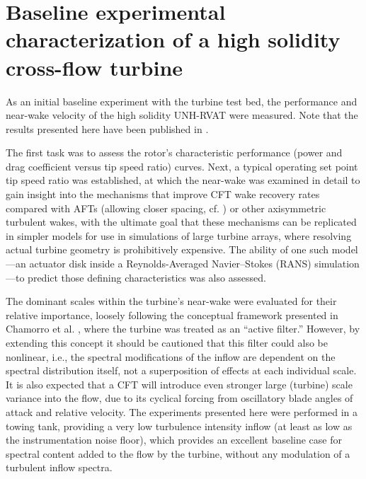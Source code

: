 \chapter{Baseline experimental characterization of a high solidity cross-flow
turbine}\label{chap:RVAT-baseline}

As an initial baseline experiment with the turbine test bed, the performance and
near-wake velocity of the high solidity UNH-RVAT were measured. Note that the
results presented here have been published in \cite{Bachant2013,
    Bachant2015-JoT}.

The first task was to assess the rotor's characteristic performance (power and
drag coefficient versus tip speed ratio) curves. Next, a typical operating set
point tip speed ratio was established, at which the near-wake was examined in
detail to gain insight into the mechanisms that improve CFT wake recovery rates
compared with AFTs (allowing closer spacing, {cf.} \cite{Kinzel2012}) or other
axisymmetric turbulent wakes, with the ultimate goal that these mechanisms can
be replicated in simpler models for use in simulations of large turbine arrays,
where resolving actual turbine geometry is prohibitively expensive. The ability
of one such model---an actuator disk inside a Reynolds-Averaged Navier--Stokes
(RANS) simulation---to predict those defining characteristics was also assessed.

The dominant scales within the turbine's near-wake were evaluated for their
relative importance, loosely following the conceptual framework presented in
Chamorro et al. \cite{Chamorro2012b}, where the turbine was treated as an
``active filter.'' However, by extending this concept it should be cautioned
that this filter could also be nonlinear, i.e., the spectral modifications of
the inflow are dependent on the spectral distribution itself, not a
superposition of effects at each individual scale. It is also expected that a
CFT will introduce even stronger large (turbine) scale variance into the flow,
due to its cyclical forcing from oscillatory blade angles of attack and relative
velocity. The experiments presented here were performed in a towing tank,
providing a very low turbulence intensity inflow (at least as low as the
instrumentation noise floor), which provides an excellent baseline case for
spectral content added to the flow by the turbine, without any modulation of a
turbulent inflow spectra.

